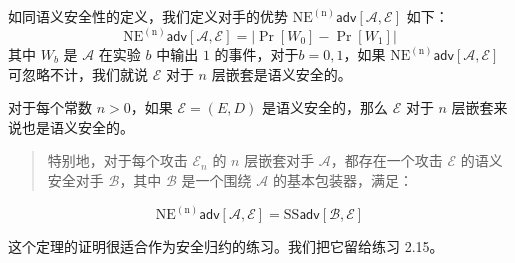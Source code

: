 如同语义安全性的定义，我们定义对手的优势 $\mathrm{NE^{(n)}}\mathsf{adv}[\mathcal{A},\mathcal{E}]$ 如下：
\[
\mathrm{NE^{(n)}}\mathsf{adv}[\mathcal{A},\mathcal{E}]=\big\vert\Pr[W_0]-\Pr[W_1]\big\vert
\]
其中 $W_b$ 是 $\mathcal{A}$ 在实验 $b$ 中输出 $1$ 的事件，对于$b=0,1$，如果 $\mathrm{NE^{(n)}}\mathsf{adv}[\mathcal{A},\mathcal{E}]$ 可忽略不计，我们就说 $\mathcal{E}$ 对于 $n$ 层嵌套是语义安全的。

\begin{theorem}
对于每个常数 $n>0$，如果 $\mathcal{E}=(E,D)$ 是语义安全的，那么 $\mathcal{E}$ 对于 $n$ 层嵌套来说也是语义安全的。
\begin{quote}
特别地，对于每个攻击 $\mathcal{E}_n$ 的 $n$ 层嵌套对手 $\mathcal{A}$，都存在一个攻击 $\mathcal{E}$ 的语义安全对手 $\mathcal{B}$，其中 $\mathcal{B}$ 是一个围绕 $\mathcal{A}$ 的基本包装器，满足：
\end{quote}
\[
\mathrm{NE^{(n)}}\mathsf{adv}[\mathcal{A},\mathcal{E}]=\mathrm{SS}\mathsf{adv}[\mathcal{B},\mathcal{E}]
\]
\end{theorem}

\noindent
这个定理的证明很适合作为安全归约的练习。我们把它留给练习 2.15。